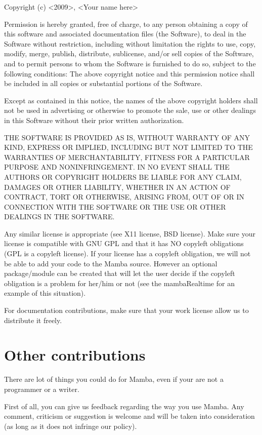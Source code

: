 \documentclass[a4paper,10pt,oneside]{article}
\begin{document}
%
\begin{minipage}[c]{0.8\textwidth}%
 {\small Copyright (c) <2009>, <Your name here>}{\small \vspace{0.5cm} \par}

{\small Permission is hereby granted, free of charge, to any person
obtaining a copy of this software and associated documentation files
(the \textquotedbl{}Software\textquotedbl{}), to deal in the Software
without restriction, including without limitation the rights to use,
copy, modify, merge, publish, distribute, sublicense, and/or sell
copies of the Software, and to permit persons to whom the Software
is furnished to do so, subject to the following conditions: The above
copyright notice and this permission notice shall be included in all
copies or substantial portions of the Software.}{\small \vspace{0.5cm} \par}

{\small Except as contained in this notice, the names of the above copyright 
holders shall not be used in advertising or otherwise to promote the sale, use 
or other dealings in this Software without their prior written authorization.}
{\small \vspace{0.5cm} \par}

{\small THE SOFTWARE IS PROVIDED \textquotedbl{}AS IS\textquotedbl{},
WITHOUT WARRANTY OF ANY KIND, EXPRESS OR IMPLIED, INCLUDING BUT NOT
LIMITED TO THE WARRANTIES OF MERCHANTABILITY, FITNESS FOR A PARTICULAR
PURPOSE AND NONINFRINGEMENT. IN NO EVENT SHALL THE AUTHORS OR COPYRIGHT
HOLDERS BE LIABLE FOR ANY CLAIM, DAMAGES OR OTHER LIABILITY, WHETHER
IN AN ACTION OF CONTRACT, TORT OR OTHERWISE, ARISING FROM, OUT OF
OR IN CONNECTION WITH THE SOFTWARE OR THE USE OR OTHER DEALINGS IN
THE SOFTWARE. }%
\vspace{1cm}
\end{minipage}

Any similar license is appropriate (see X11 license, BSD license). Make sure
your license is compatible with GNU GPL and that it has NO copyleft
obligations (GPL is a copyleft license). If your license has a copyleft
obligation, we will not be able to add your code to the Mamba source. However
an optional package/module can be created that will let the user decide if the
copyleft obligation is a problem for her/him or not (see the mambaRealtime for
an example of this situation).

For documentation contributions, make sure that your work license
allow us to distribute it freely.

\section{Other contributions}

There are lot of things you could do for Mamba, even if your are not
a programmer or a writer.

First of all, you can give us feedback regarding the way you use Mamba.
Any comment, criticism or suggestion is welcome and will be taken
into consideration (as long as it does not infringe our policy).
\end{document}
